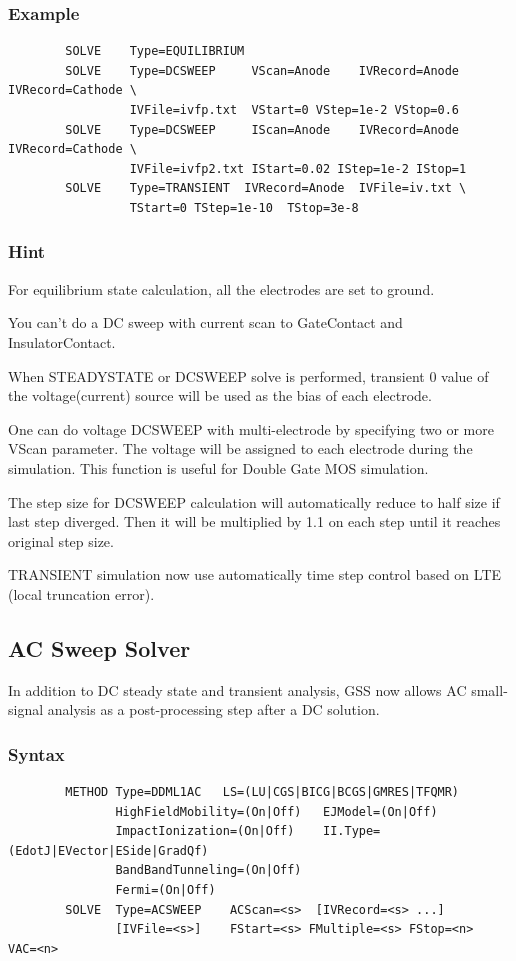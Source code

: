 \documentclass[11pt,pdftex]{article}
\begin{document}
\subsubsection*{Example}
\begin{verbatim}
        SOLVE    Type=EQUILIBRIUM
        SOLVE    Type=DCSWEEP     VScan=Anode    IVRecord=Anode IVRecord=Cathode \
                 IVFile=ivfp.txt  VStart=0 VStep=1e-2 VStop=0.6
        SOLVE    Type=DCSWEEP     IScan=Anode    IVRecord=Anode IVRecord=Cathode \
                 IVFile=ivfp2.txt IStart=0.02 IStep=1e-2 IStop=1
        SOLVE    Type=TRANSIENT  IVRecord=Anode  IVFile=iv.txt \
                 TStart=0 TStep=1e-10  TStop=3e-8
\end{verbatim}

\subsubsection*{Hint}

For equilibrium state calculation, all the electrodes are set to
ground.

You can't do a DC sweep with current scan to GateContact and
InsulatorContact.

When STEADYSTATE or DCSWEEP solve is performed, transient 0 value of
the voltage(current) source will be used as the bias of each
electrode.

One can do voltage DCSWEEP with multi-electrode by specifying two or more VScan parameter.
The voltage will be assigned to each electrode during the simulation. This function is useful
for Double Gate MOS simulation.

The step size for DCSWEEP calculation will
automatically reduce to half size if last step diverged. Then it
will be multiplied by 1.1 on each step until it reaches original
step size.

TRANSIENT simulation now use automatically time step control based on LTE (local truncation error).

\newpage
\subsection{AC Sweep Solver}
In addition to DC steady state and transient analysis, GSS now
allows AC small-signal analysis as a post-processing step after a DC
solution.

\subsubsection*{Syntax}
\begin{verbatim}
        METHOD Type=DDML1AC   LS=(LU|CGS|BICG|BCGS|GMRES|TFQMR)
               HighFieldMobility=(On|Off)   EJModel=(On|Off)
               ImpactIonization=(On|Off)    II.Type=(EdotJ|EVector|ESide|GradQf)
               BandBandTunneling=(On|Off)
               Fermi=(On|Off)
        SOLVE  Type=ACSWEEP    ACScan=<s>  [IVRecord=<s> ...]
               [IVFile=<s>]    FStart=<s> FMultiple=<s> FStop=<n>   VAC=<n>
\end{verbatim}
\end{document}
